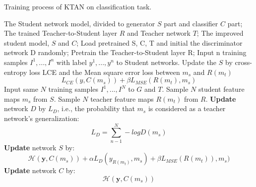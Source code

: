 \documentclass[letterpaper]{article} %
\begin{document}
\begin{algorithm}[htb!]
	\caption{Training process of KTAN on classification task.}
	\label{alg:process}
	\begin{algorithmic}
		\Require
		The Student network model, divided to generator $S$ part and classifier $C$ part;
		The trained Teacher-to-Student layer $R$ and Teacher network $T$;
		\Ensure
		The improved student model, $S$ and $C$;
		\State Load pretrained S, C, T and initial the discriminator network D randomly;
		Pretrain the Teacher-to-Student layer R;
		\State Input n training samples ${I^1,...,I^n}$ with label ${y^1,...,y^n}$ to Student networks.
		\State Update the $S$ by cross-entropy loss LCE and the Mean square error loss between $m_s$ and $R(m_t)$
		\begin{equation*}
		L_{CE}(y,C(m_s))+\beta L_{MSE}(R(m_t),m_s)
		\end{equation*}
		\EndFor
		\State Input same $N$ training samples ${I^{1},...,I^{N}}$ to $G$ and $T$.
		\State Sample $N$ student feature maps $m_{s}$ from $S$.
		\State Sample $N$ teacher feature maps $R(m_{t})$ from $R$.
		\State \textbf{Update} network $D$ by $L_{D}$, i.e., the probability that $m_{s}$ is considered as a teacher network's generalization:
		\begin{equation*}
			L_{D}=\sum_{n-1}^{N}-logD(m_{s})
		\end{equation*}
		\State \textbf{Update} network $S$ by:
		\begin{equation*}
				\mathcal{H}(\textbf{y},C(m_{s}))+\alpha L_{D}(y_{R(m_{t})},m_{s})+\beta L_{MSE}(R(m_{t})),m_{s})
		\end{equation*}
		\State \textbf{Update} network $C$ by:
		\begin{equation*}
			\mathcal{H}(\textbf{y},C(m_{s}))
		\end{equation*}
		\EndFor
	\end{algorithmic}
\end{algorithm}

\end{document}
